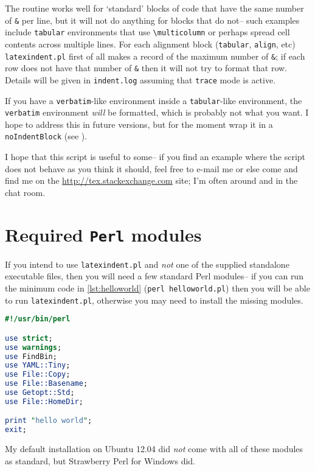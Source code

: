 The routine works well for `standard' blocks of code that have the same number of \lstinline!&!
per line, but it will not do anything for blocks that do not-- such examples 
include \lstinline!tabular! environments that use \lstinline!\multicolumn! or 
perhaps spread cell contents across multiple lines.  For each alignment block (\lstinline!tabular!, 
\lstinline!align!, etc) \lstinline!latexindent.pl! first of all makes a record 
of the maximum number of \lstinline!&!; if each row does not have that 
number of \lstinline!&! then it will not try to format that row. Details 
will be given in \lstinline!indent.log! assuming that \lstinline!trace! mode
is active.

If you have a \lstinline!verbatim!-like environment inside a \lstinline!tabular!-like
environment, the \lstinline!verbatim! environment \emph{will} be formatted, which 
is probably not what you want. I hope to address this in future versions, but for the 
moment wrap it in a \lstinline!noIndentBlock! (see ).
      
I hope that this script is useful to some-- if you find an example where the 
script does not behave as you think it should, feel free to e-mail me or else
come and find me on the \url{http://tex.stackexchange.com} site; I'm often around 
and in the chat room.
      
\printbibliography[heading=bibintoc]

\appendix
\section{Required \lstinline!Perl! modules}\label{sec:requiredmodules}
If you intend to use \lstinline!latexindent.pl! and \emph{not} one of the supplied standalone executable files, then you will need a few standard Perl modules-- if you can run the 
minimum code in \cref{lst:helloworld} (\lstinline!perl helloworld.pl!) then you will be able to run \lstinline!latexindent.pl!, otherwise you may 
need to install the missing modules.
 	 	 	 	 	
\begin{lstlisting}[language=Perl,caption={\lstinline!helloworld.pl!},label={lst:helloworld}]
#!/usr/bin/perl

use strict;
use warnings;           
use FindBin;            
use YAML::Tiny;         
use File::Copy;         
use File::Basename;     
use Getopt::Std;        
use File::HomeDir;      

print "hello world";
exit;
\end{lstlisting}
My default installation on Ubuntu 12.04 did \emph{not} come
with all of these modules as standard, but Strawberry Perl for Windows \cite{strawberryperl}
did.
	
